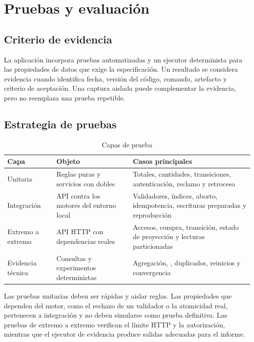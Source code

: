 \chapter{Pruebas y evaluación}
\label{chap:validacion}

\section{Criterio de evidencia}

La aplicación incorpora pruebas automatizadas y un ejecutor determinista para las propiedades de datos que exige la especificación. Un resultado se considera evidencia cuando identifica fecha, versión del código, comando, artefacto y criterio de aceptación. Una captura aislada puede complementar la evidencia, pero no reemplaza una prueba repetible.

\section{Estrategia de pruebas}

\begin{table}[H]
  \centering
  \caption{Capas de prueba}
  \label{tab:capas-prueba}
  \begin{tabularx}{\textwidth}{@{}p{2.8cm}p{4.4cm}Y@{}}
    \toprule
    \textbf{Capa} & \textbf{Objeto} & \textbf{Casos principales} \\
    \midrule
    Unitaria & Reglas puras y servicios con dobles & Totales, cantidades, transiciones, autenticación, reclamo y retroceso \\
    Integración & API contra los motores del entorno local & Validadores, índices, aborto, idempotencia, escrituras preparadas y reproducción \\
    Extremo a extremo & API HTTP con dependencias reales & Accesos, compra, transición, estado de proyección y lecturas particionadas \\
    Evidencia técnica & Consultas y experimentos deterministas & Agregación, , duplicados, reinicios y convergencia \\
    \bottomrule
  \end{tabularx}
\end{table}

Las pruebas unitarias deben ser rápidas y aislar reglas. Las propiedades que dependen del motor, como el rechazo de un validador o la atomicidad real, pertenecen a integración y no deben simularse como prueba definitiva. Las pruebas de extremo a extremo verifican el límite HTTP y la autorización, mientras que el ejecutor de evidencia produce salidas adecuadas para el informe.


